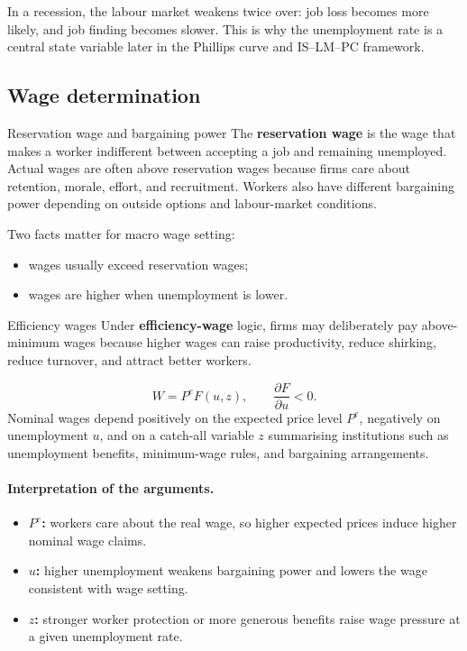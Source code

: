 \begin{policynote}
In a recession, the labour market weakens twice over: job loss becomes more likely, and job finding becomes slower. This is why the unemployment rate is a central state variable later in the Phillips curve and IS--LM--PC framework.
\end{policynote}

\subsection{Wage determination}

\begin{definition}{Reservation wage and bargaining power}{}
The \textbf{reservation wage} is the wage that makes a worker indifferent between accepting a job and remaining unemployed. Actual wages are often above reservation wages because firms care about retention, morale, effort, and recruitment. Workers also have different bargaining power depending on outside options and labour-market conditions.
\end{definition}

Two facts matter for macro wage setting:
\begin{itemize}[leftmargin=1.5em]
\item wages usually exceed reservation wages;
\item wages are higher when unemployment is lower.
\end{itemize}

\begin{definition}{Efficiency wages}{}
Under \textbf{efficiency-wage} logic, firms may deliberately pay above-minimum wages because higher wages can raise productivity, reduce shirking, reduce turnover, and attract better workers.
\end{definition}

\begin{keyformula}[title={Key Formula: Wage-setting relation}]
\[
W=P^eF(u,z),
\qquad
\frac{\partial F}{\partial u}<0.
\]
Nominal wages depend positively on the expected price level $P^e$, negatively on unemployment $u$, and on a catch-all variable $z$ summarising institutions such as unemployment benefits, minimum-wage rules, and bargaining arrangements.
\end{keyformula}

\paragraph{Interpretation of the arguments.}
\begin{itemize}[leftmargin=1.5em]
\item \textbf{$P^e$:} workers care about the real wage, so higher expected prices induce higher nominal wage claims.
\item \textbf{$u$:} higher unemployment weakens bargaining power and lowers the wage consistent with wage setting.
\item \textbf{$z$:} stronger worker protection or more generous benefits raise wage pressure at a given unemployment rate.
\end{itemize}

